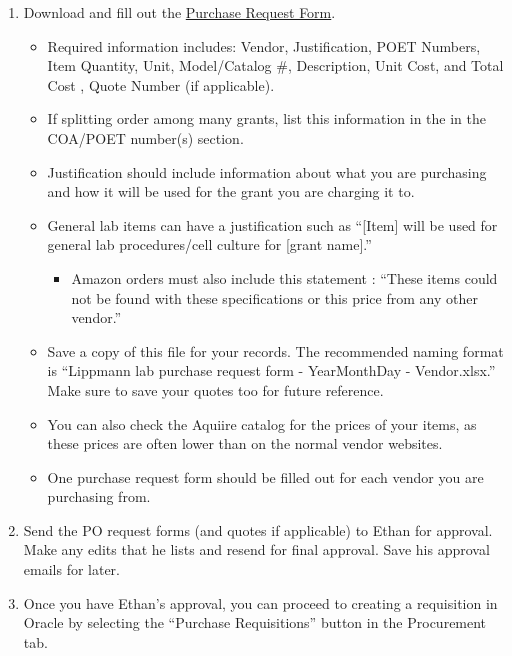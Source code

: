 \documentclass[
]{book}
\providecommand{\tightlist}{%
  \setlength{\itemsep}{0pt}\setlength{\parskip}{0pt}}
\begin{document}
\begin{enumerate}
\def\labelenumi{\arabic{enumi}.}
\item
  Download and fill out the \href{https://drive.google.com/file/d/1sv-9x9ky6_tleJ2rFb5CJseFnJjDlw88/view?usp=sharing}{Purchase Request Form}.

  \begin{itemize}
  \item
    Required information includes: Vendor, Justification, POET Numbers, Item Quantity, Unit, Model/Catalog \#, Description, Unit Cost, and Total Cost , Quote Number (if applicable).
  \item
    If splitting order among many grants, list this information in the in the COA/POET number(s) section.
  \item
    Justification should include information about what you are purchasing and how it will be used for the grant you are charging it to.
  \item
    General lab items can have a justification such as ``{[}Item{]} will be used for general lab procedures/cell culture for {[}grant name{]}.''

    \begin{itemize}
    \tightlist
    \item
      Amazon orders must also include this statement : ``These items could not be found with these specifications or this price from any other vendor.''
    \end{itemize}
  \item
    Save a copy of this file for your records. The recommended naming format is ``Lippmann lab purchase request form - YearMonthDay - Vendor.xlsx.'' Make sure to save your quotes too for future reference.
  \item
    You can also check the Aquiire catalog for the prices of your items, as these prices are often lower than on the normal vendor websites.
  \item
    One purchase request form should be filled out for each vendor you are purchasing from.
  \end{itemize}
\item
  Send the PO request forms (and quotes if applicable) to Ethan for approval. Make any edits that he lists and resend for final approval. Save his approval emails for later.
\item
  Once you have Ethan's approval, you can proceed to creating a requisition in Oracle by selecting the ``Purchase Requisitions'' button in the Procurement tab.
\end{enumerate}
\end{document}
